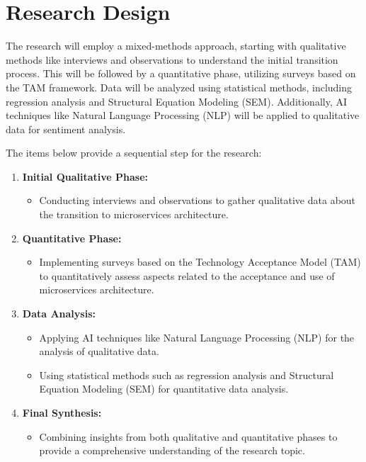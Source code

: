 \documentclass{article}
\begin{document}
\section{Research Design}
\label{sec:researchDesign}

The research will employ a mixed-methods approach, starting with qualitative methods like interviews and observations to understand the initial transition process. This will be followed by a quantitative phase, utilizing surveys based on the TAM framework. Data will be analyzed using statistical methods, including regression analysis and Structural Equation Modeling (SEM). Additionally, AI techniques like Natural Language Processing (NLP) will be applied to qualitative data for sentiment analysis.

The items below provide a sequential step for the research: 

\begin{enumerate}
    \item \textbf{Initial Qualitative Phase:}
    \begin{itemize}
        \item Conducting interviews and observations to gather qualitative data about the transition to microservices architecture.
    \end{itemize}
    
    \item \textbf{Quantitative Phase:}
    \begin{itemize}
        \item Implementing surveys based on the Technology Acceptance Model (TAM) to quantitatively assess aspects related to the acceptance and use of microservices architecture.
    \end{itemize}
    
    \item \textbf{Data Analysis:}
    \begin{itemize}
        \item Applying AI techniques like Natural Language Processing (NLP) for the analysis of qualitative data.
        \item Using statistical methods such as regression analysis and Structural Equation Modeling (SEM) for quantitative data analysis.
    \end{itemize}
    
    \item \textbf{Final Synthesis:}
    \begin{itemize}
        \item Combining insights from both qualitative and quantitative phases to provide a comprehensive understanding of the research topic.
    \end{itemize}
\end{enumerate}
\end{document}
